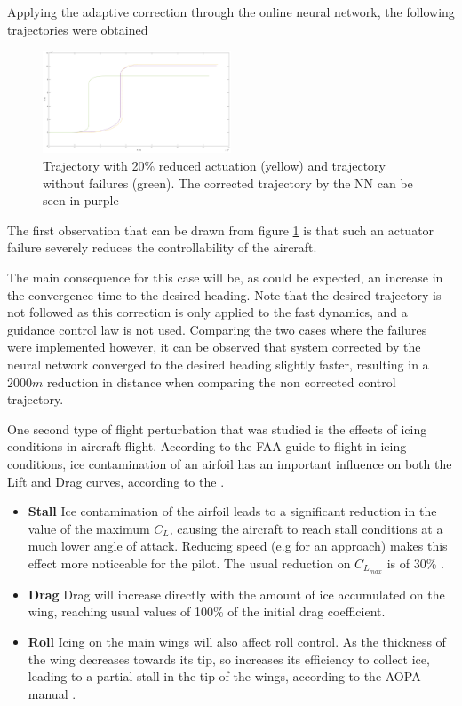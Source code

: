 Applying the adaptive correction through the online neural network, the following trajectories were obtained

\begin{figure}[h]
\centering
\includegraphics[width=0.5\textwidth]{../Figures/Results/reduced_act_NN.png}
\caption[Trajectory with reduced actuation corrected with NN correction]{Trajectory with 20\% reduced actuation (yellow) and trajectory without failures (green). The corrected trajectory by the NN can be seen in purple}
\label{fig:reduced_act_NN}
\end{figure}

The first observation that can be drawn from figure \ref{fig:reduced_act_NN} is that such an actuator failure severely reduces the controllability of the aircraft. 

The main consequence for this case will be, as could be expected, an increase in the convergence time to the desired heading. Note that the desired trajectory is not followed as this correction is only applied to the fast dynamics, and a guidance control law is not used. Comparing the two cases where the failures were implemented however, it can be observed that system corrected by the neural network converged to the desired heading slightly faster, resulting in a $2000m$ reduction in distance when comparing the non corrected control trajectory. 

One second type of flight perturbation that was studied is the effects of icing conditions in aircraft flight. According to the FAA guide to flight in icing conditions, ice contamination of an airfoil has an important influence on both the Lift and Drag curves, according to the \cite{icing_cond}.

\begin{itemize}
\item \textbf{Stall }Ice contamination of the airfoil leads to a significant reduction in the value of the maximum $C_L$, causing the aircraft to reach stall conditions at a much lower angle of attack. Reducing speed (e.g for an approach) makes this effect more noticeable for the pilot. The usual reduction on $C_{L_{max}}$ is of 30\% \cite{icing_cond}.

\item \textbf{Drag }Drag will increase directly with the amount of ice accumulated on the wing, reaching usual values of 100\% of the initial drag coefficient.

\item \textbf{Roll }Icing on the main wings will also affect roll control. As the thickness of the wing decreases towards its tip, so increases its efficiency to collect ice, leading to a partial stall in the tip of the wings, according to the AOPA manual \cite{icing_aopa}.
\end{itemize}

